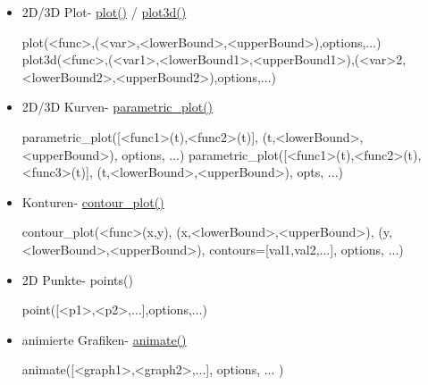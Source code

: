\documentclass[a4paper,9pt,DIV15]{scrartcl}
\begin{document}
\begin{itemize}
\item 2D/3D Plot- \href{https://sage.math.uni-goettingen.de/doc/static/reference/sage/combinat/e_one_star.html?highlight=.plot#sage.combinat.e_one_star.Patch.plot}{plot()}	/	\href{https://sage.math.uni-goettingen.de/doc/static/reference/sage/combinat/e_one_star.html?highlight=.plot#sage.combinat.e_one_star.Patch.plot3d}{plot3d()}
\begin{sagein}
plot(<func>,(<var>,<lowerBound>,<upperBound>),options,...)
plot3d(<func>,(<var1>,<lowerBound1>,<upperBound1>),(<var>2,<lowerBound2>,<upperBound2>),options,...)
\end{sagein}
\item 2D/3D Kurven- \href{https://sage.math.uni-goettingen.de/doc/static/reference/sage/plot/plot.html?highlight=.plot#sage.plot.plot.parametric_plot}{parametric\_plot()}
\begin{sagein}
parametric_plot([<func1>(t),<func2>(t)], (t,<lowerBound>,<upperBound>), options, ...)
parametric_plot([<func1>(t),<func2>(t),<func3>(t)], (t,<lowerBound>,<upperBound>), opts, ...)
\end{sagein}
\item Konturen- \href{https://sage.math.uni-goettingen.de/doc/static/reference/sage/plot/contour_plot.html#sage.plot.contour_plot.contour_plot}{contour\_plot()}
\begin{sagein}
contour_plot(<func>(x,y), (x,<lowerBound>,<upperBound>), (y,<lowerBound>,<upperBound>), contours=[val1,val2,...], options, ...)
\end{sagein}
\item 2D Punkte- points()
	\begin{sagein}
point([<p1>,<p2>,$\ldots$],options,$\ldots$)
	\end{sagein}

\item animierte Grafiken- \href{https://sage.math.uni-goettingen.de/doc/static/reference/sage/plot/animate.html?highlight=.plot#sage.plot.animate.Animation}{animate()}
\begin{sagein}
animate([<graph1>,<graph2>,...], options, ... ) 
\end{sagein}
\end{itemize}
\end{document}
